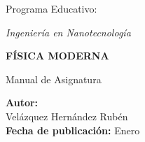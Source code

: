 \documentclass[oneside,12pt]{book}
\begin{document}
\begin{titlepage}
\begin{center}
			
			\vspace{0.5cm}
			
			{\Large\textcolor{uteqDarkBlue}{Programa Educativo:}}
			
			\vspace{0.4cm}
			{\Large\textit{Ingeniería en Nanotecnología}}
			
			\vspace{2.5cm}
			
			{\fontsize{24}{28}\selectfont\textbf{\textcolor{uteqGreen}{FÍSICA MODERNA}}}
			
			\vspace{0.8cm}
			{\Large Manual de Asignatura \the\year}
			
			\vspace{3.5cm}
			
			\begin{minipage}{0.8\textwidth}
				\begin{flushright}
					\textbf{Autor:} \\
					Velázquez Hernández Rubén \\
					\vspace{0.3cm}
					\textbf{Fecha de publicación:} Enero \the\year
				\end{flushright}
			\end{minipage}
			
			\vfill
			
			
		\end{center}
	\end{titlepage}
	
	\restoregeometry
	
	\pagestyle{fancy}
	
	\tableofcontents
	
	

	\mainmatter

	
	
	
	
	
	
\end{document}
